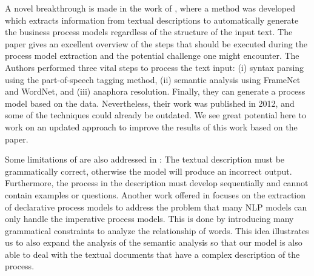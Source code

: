 	A novel breakthrough is made in the work of \cite{t2m_1}, where a method was developed which extracts information from textual descriptions to automatically generate the business process models regardless of the structure of the input text. The paper gives an excellent overview of the steps that should be executed during the process model extraction and the potential challenge one might encounter. The Authors performed three vital steps to process the text input: (i) syntax parsing using the part-of-speech tagging method, (ii) semantic analysis using FrameNet and WordNet, and (iii) anaphora resolution. Finally, they can generate a process model based on the data. Nevertheless, their work was published in 2012, and some of the techniques could already be outdated. We see great potential here to work on an updated approach to improve the results of this work based on the paper.
	
	 Some limitations of \cite{t2m_1} are also addressed in \cite{pre_processing_1}: The textual description must be grammatically correct, otherwise the model will produce an incorrect output. Furthermore, the process in the description must develop sequentially and cannot contain examples or questions. Another work offered in \cite{t2m_2} focuses on the extraction of declarative process models to address the problem that many NLP models can only handle the imperative process models. This is done by introducing many grammatical constraints to analyze the relationship of words. This idea illustrates us to also expand the analysis of the semantic analysis so that our model is also able to deal with the textual documents that have a complex description of the process. 
	 
